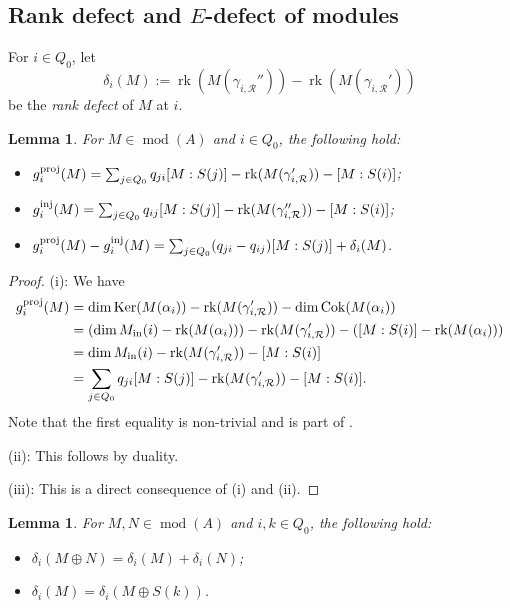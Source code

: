 \documentclass[12pt,reqno]{amsart}
\newtheorem{Lem}[Thm]{Lemma}
\theoremstyle{definition}
\newcommand{\cR}{{\mathcal R}}
\newcommand{\rk}{\operatorname{rk}}
\newcommand{\md}{\operatorname{mod}}
\newcommand{\Ker}{\operatorname{Ker}}
\newcommand{\Coker}{\operatorname{Cok}}
\begin{document}
\subsection{Rank defect and $E$-defect of modules}
For $i \in Q_0$,
let 
$$
\delta_i(M) := \rk(M(\gamma_{i,\cR}'')) - \rk(M(\gamma_{i,\cR}')) 
$$
be the \emph{rank defect} of $M$ at $i$.

\begin{Lem}\label{lem:gvector2}
For $M \in \md(A)$ and $i \in Q_0$, the following hold:
\begin{itemize}\itemsep2mm

\item[(i)]
$g_i^{\rm proj}(M) = \sum_{j \in Q_0} q_{ji} [M:S(j)]
- \rk(M(\gamma_{i,\cR}')) - [M:S(i)]$;

\item[(ii)]
$g_i^{\rm inj}(M) = \sum_{j \in Q_0} q_{ij} [M:S(j)] 
- \rk(M(\gamma_{i,\cR}'')) - [M:S(i)]$;

\item[(iii)]
$g_i^{\rm proj}(M) - g_i^{\rm inj}(M) = \sum_{j \in Q_0} 
(q_{ji} - q_{ij}) [M:S(j)] + \delta_i(M)$.

\end{itemize}
\end{Lem}

\begin{proof}
(i):
We have
\begin{align*}
g_i^{\rm proj}(M) &= \dim \Ker(M(\alpha_i)) - \rk(M(\gamma_{i,\cR}'))
- \dim \Coker(M(\alpha_i))
\\
&= (\dim M_{\rm in}(i) - \rk(M(\alpha_i))) - \rk(M(\gamma_{i,\cR}'))
- ([M:S(i)] - \rk(M(\alpha_i)))
\\
&= \dim M_{\rm in}(i) -  \rk(M(\gamma_{i,\cR}')) - [M:S(i)]
\\
&= \sum_{j \in Q_0} q_{ji} [M:S(j)]
- \rk(M(\gamma_{i,\cR}')) - [M:S(i)].
\end{align*}
Note that
the first equality is non-trivial and is part of  
\cite[Theorem~1.1]{GHLS26}.

(ii): This follows by duality.

(iii): This is a direct consequence of (i) and (ii).
\end{proof}

\begin{Lem}\label{lem:gvector3}
For $M,N \in \md(A)$ and $i,k \in Q_0$, 
the following hold:
\begin{itemize}\itemsep2mm

\item[(i)]
$\delta_i(M \oplus N) = \delta_i(M) + \delta_i(N)$;

\item[(ii)]
$\delta_i(M) = \delta_i(M \oplus S(k))$.

\end{itemize}
\end{Lem}
\end{document}
